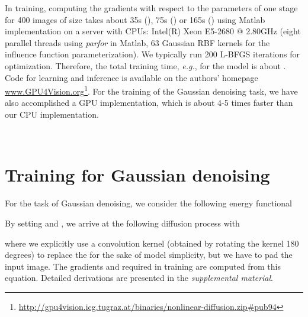 \documentclass[10pt,journal,compsoc]{IEEEtran}
\newcommand{\eg}{\emph{e.g.}}
\newcommand{\ie}{\emph{i.e.}}
\begin{document}
In training, computing the gradients  with respect to the parameters of one stage 
for 400 images of size  takes about 35s (), 75s () or 
165s () using Matlab implementation on a server with CPUs: Intel(R) Xeon E5-2680 @ 2.80GHz 
(eight parallel threads using \textit{parfor} in Matlab, 
63 Gaussian RBF kernels for the influence function parameterization). We typically run 200 L-BFGS 
iterations for optimization. Therefore, the total training time, \eg, for the  model is about 
. Code for learning and inference is available on the authors' homepage 
\url{www.GPU4Vision.org}\footnote{
\url{http://gpu4vision.icg.tugraz.at/binaries/nonlinear-diffusion.zip\#pub94}}. 
For the training of the Gaussian denoising task, we have also accomplished a GPU implementation, 
which is about 4-5 times faster than our CPU implementation. 
\begin{figure*}[t!]
\centering
{}\hfill
{}\hfill
{}\hfill
{}\hfill
{}\hfill
{}\\
\vspace*{-0.2cm}
\caption{An image denoising example for noise level  
to illustrate how our learned  works. (b) - (e) are 
intermediate results at stage 1 - 4, and (f) is the output of stage 5, \ie, the final denoising result.}\label{fig:denoising}
\vspace*{-0.25cm}
\end{figure*}

\section{Training for Gaussian denoising}\label{sec:denoising}
For the task of Gaussian denoising, we consider the following energy functional

By setting  and , 
we arrive at the following 
diffusion process with 

where we explicitly use a convolution kernel  (obtained by rotating the kernel  180 degrees) 
to replace the  for the sake of model simplicity, but we have to pad the input image. The gradients 
 and  
required in training are computed from this equation. Detailed derivations are presented in the \textit{supplemental material}. 
\end{document}
